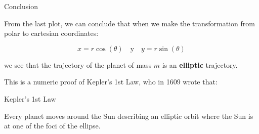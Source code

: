 \documentclass[hyperref={pdfpagelabels=false}]{beamer}
\begin{document}
\begin{frame}{Conclusion}
\vspace{-10pt}

From the last plot, we can conclude that when we make the transformation from polar to cartesian coordinates:

\begin{equation}
x= r\cos(\theta) \quad \text{y} \quad y= r\sin(\theta)
\end{equation}

we see that the trajectory of the planet of mass $m$ is an \textbf{elliptic} trajectory.

This is a numeric proof of Kepler's 1st Law, who in 1609 wrote that:

\begin{block}{Kepler's 1st Law}

Every planet moves around the Sun describing an elliptic orbit where the Sun is at one of the foci of the ellipse.
\end{block}

    
\end{frame}
\end{document}
